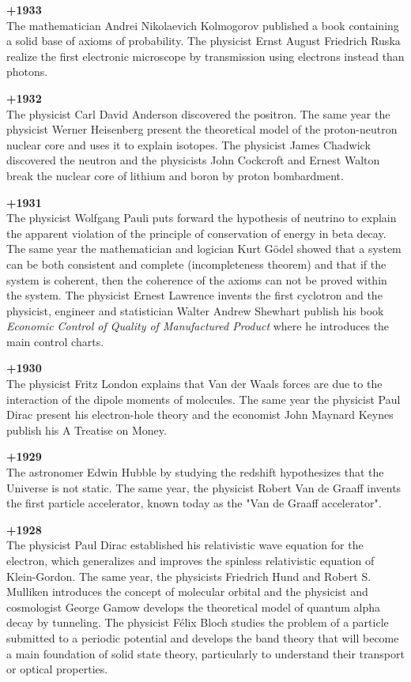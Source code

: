 \textbf{+1933}\\
The mathematician Andrei Nikolaevich Kolmogorov published a book containing a solid base of axioms of probability. The physicist Ernst August Friedrich Ruska realize the first electronic microscope by transmission using electrons instead than photons.

\textbf{+1932}\\
The physicist Carl David Anderson discovered the positron. The same year the physicist Werner Heisenberg present the theoretical model of the proton-neutron nuclear core and uses it to explain isotopes. The physicist James Chadwick discovered the neutron and the physicists John Cockcroft and Ernest Walton break the nuclear core of lithium and boron by proton bombardment.

\textbf{+1931}\\
The physicist Wolfgang Pauli puts forward the hypothesis of neutrino to explain the apparent violation of the principle of conservation of energy in beta decay. The same year the mathematician and logician Kurt Gödel showed that a system can be both consistent and complete (incompleteness theorem) and that if the system is coherent, then the coherence of the axioms can not be proved within the system. The physicist Ernest Lawrence invents the first cyclotron and the physicist, engineer and statistician Walter Andrew Shewhart publish his book \textit{Economic Control of Quality of Manufactured Product} where he introduces the main control charts.

\textbf{+1930}\\
The physicist Fritz London explains that Van der Waals forces are due to the interaction of the dipole moments of molecules. The same year the physicist Paul Dirac present his electron-hole theory and the economist John Maynard Keynes publish his A Treatise on Money.

\textbf{+1929}\\
The astronomer Edwin Hubble by studying the redshift hypothesizes that the Universe is not static. The same year, the physicist Robert Van de Graaff invents the first particle accelerator, known today as the "Van de Graaff accelerator".

\textbf{+1928}\\
The physicist Paul Dirac established his relativistic wave equation for the electron, which generalizes and improves the spinless relativistic equation of Klein-Gordon. The same year, the physicists Friedrich Hund and Robert S. Mulliken introduces the concept of molecular orbital and the physicist and cosmologist George Gamow develops the theoretical model of quantum alpha decay by tunneling. The physicist Félix Bloch studies the problem of a particle submitted to a periodic potential and develops the band theory that will become a main foundation of solid state theory, particularly to understand their transport or optical properties.

